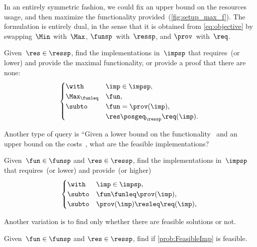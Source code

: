 In an entirely symmetric fashion, we could fix an upper bound on
the resources usage, and then maximize the functionality provided~(\cref{fig:setup_max_f}).
The formulation is entirely dual, in the sense that it is obtained
from \cref{eq:objective} by swapping~$\Min$ with~$\Max$, $\funsp$~with~$\ressp$,
and $\prov$~with~$\req$.

\begin{problem}[\FixResMinFun]
    Given~$\res\in\ressp$, find the implementations
    in~$\impsp$ that requires~\res (or lower)
    and provide the maximal functionality, or provide a proof that there are none:
    \begin{equation}
        \begin{cases}
            \with & \imp\in\impsp,\\
            \Max_{\funleq} & \fun,\\
            \subto & \fun=\prov(\imp),\\
            & \res\posgeq_{\ressp}\req(\imp).
        \end{cases}\label{eq:objective-1}
    \end{equation}
\end{problem}



Another type of query is
``Given a lower bound on the functionality~\fun
and an upper bound on the costs~\fun, what are the feasible implementations?


\begin{problem}[\FeasibleImp]\label{prob:FeasibleImp}
    Given~$\fun\in\funsp$ and $\res\in\ressp$, find the implementations
    in~$\impsp$ that requires~\res (or lower)
    and provide~\fun (or higher)
    \begin{equation}
        \begin{cases}
            \with & \imp\in\impsp,\\
            \subto & \fun \funleq \prov(\imp),\\
            \subto &  \prov(\imp) \resleq \req(\imp) ,\\
        \end{cases}
    \end{equation}
\end{problem}

Another variation is to find only whether there are feasible solutions or not.

\begin{problem}[\Feasibility]\label{prob:Feasibility}
    Given~$\fun\in\funsp$ and $\res\in\ressp$, find if \cref{prob:FeasibleImp} is feasible.
\end{problem}
